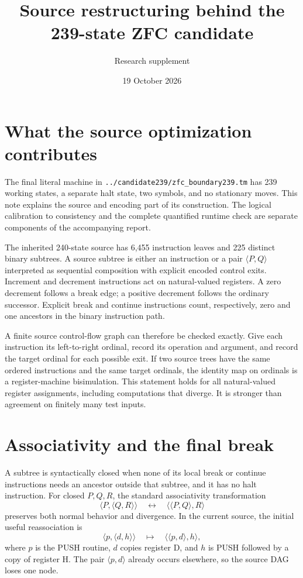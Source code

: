 \documentclass[10pt]{article}
\title{Source restructuring behind the 239-state ZFC candidate}
\author{Research supplement}
\date{19 October 2026}
\newcommand{\Seq}[2]{\langle #1,#2\rangle}
\begin{document}
\maketitle

\section{What the source optimization contributes}
The final literal machine in \texttt{../candidate239/zfc\_boundary239.tm}
has 239 working states, a separate halt state, two symbols, and no stationary
moves. This note explains the source and encoding part of its construction.
The logical calibration to consistency and the complete quantified runtime
check are separate components of the accompanying report.

The inherited 240-state source has 6,455 instruction leaves and 225 distinct
binary subtrees. A source subtree is either an instruction or a pair
$\Seq{P}{Q}$ interpreted as sequential composition with explicit encoded
control exits. Increment and decrement instructions act on natural-valued
registers. A zero decrement follows a break edge; a positive decrement
follows the ordinary successor. Explicit break and continue instructions
count, respectively, zero and one ancestors in the binary instruction path.

A finite source control-flow graph can therefore be checked exactly. Give
each instruction its left-to-right ordinal, record its operation and argument,
and record the target ordinal for each possible exit. If two source trees
have the same ordered instructions and the same target ordinals, the identity
map on ordinals is a register-machine bisimulation. This statement holds for
all natural-valued register assignments, including computations that diverge.
It is stronger than agreement on finitely many test inputs.

\section{Associativity and the final break}
A subtree is syntactically closed when none of its local break or continue
instructions needs an ancestor outside that subtree, and it has no halt
instruction. For closed $P,Q,R$, the standard associativity transformation
\[
 \Seq{P}{\Seq{Q}{R}} \quad\longleftrightarrow\quad
 \Seq{\Seq{P}{Q}}{R}
\]
preserves both normal behavior and divergence. In the current source, the
initial useful reassociation is
\[
 \Seq{p}{\Seq{d}{h}}
 \quad\longmapsto\quad
 \Seq{\Seq{p}{d}}{h},
\]
where $p$ is the PUSH routine, $d$ copies register D, and $h$ is PUSH followed
by a copy of register H. The pair $\Seq{p}{d}$ already occurs elsewhere,
so the source DAG loses one node.
\end{document}
